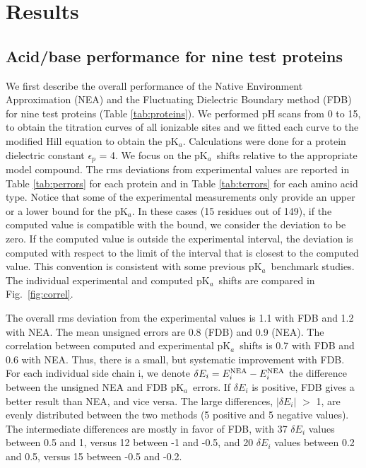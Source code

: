 \documentclass[a4paper,12pt]{article}
\newcommand{\pk}{pK$_a$}
\begin{document}
\section{Results}
\subsection{Acid/base performance for nine test proteins}
We first describe the overall performance of the Native Environment Approximation (NEA) and the
Fluctuating Dielectric Boundary method (FDB) for nine test proteins (Table \ref{tab:proteins}). We
performed pH scans from 0 to 15, to obtain the titration curves of all ionizable sites and we fitted
each curve to the modified Hill equation to obtain the \pk. Calculations were done for a protein
dielectric constant $\epsilon_p$ = 4. We focus on the \pk\ shifts relative to the appropriate model
compound. The rms deviations from experimental values are reported in Table \ref{tab:perrors} for
each protein and in Table \ref{tab:terrors} for each amino acid type. Notice that some of the
experimental measurements only provide an upper or a lower bound for the \pk. In these cases (15
residues out of 149), if the computed value is compatible with the bound, we consider the deviation
to be zero. If the computed value is outside the experimental interval, the deviation is computed
with respect to the limit of the interval that is closest to the computed value. This convention
is consistent with some previous \pk\ benchmark studies. The individual experimental and computed
\pk\ shifts are compared in Fig.\ \ref{fig:correl}. 

The overall rms deviation from the experimental values is 1.1 with FDB and 1.2 with NEA. The mean
unsigned errors are 0.8 (FDB) and 0.9 (NEA). The correlation between computed and experimental \pk\
shifts is 0.7 with FDB and 0.6 with NEA. Thus, there is a small, but systematic improvement with FDB.
For each individual side chain i, we denote $\delta E_i = E_i^{\rm NEA} - E_i^{\rm NEA}$ the difference
between the unsigned NEA and FDB \pk\ errors. If $\delta E_i$ is positive, FDB gives a better result
than NEA, and vice versa. The large differences, $|\delta E_i|$ $>$ 1, are evenly distributed between
the two methods (5 positive and 5 negative values). The intermediate differences are mostly in favor
of FDB, with 37 $\delta E_i$ values between 0.5 and 1, versus 12 between -1 and -0.5, and 20 $\delta E_i$
values between 0.2 and 0.5, versus 15 between -0.5 and -0.2.
\end{document}

